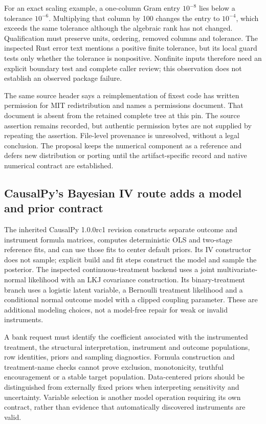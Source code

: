 For an exact scaling example, a one-column Gram entry $10^{-8}$ lies below
a tolerance $10^{-6}$. Multiplying that column by 100 changes the entry to
$10^{-4}$, which exceeds the same tolerance although the algebraic rank
has not changed. Qualification must preserve units, ordering, removed
columns and tolerance. The inspected Rust error text mentions a positive
finite tolerance, but its local guard tests only whether the tolerance is
nonpositive. Nonfinite inputs therefore need an explicit boundary test and
complete caller review; this observation does not establish an observed
package failure.~\citep{exec25_pyrdiv_pyfixest,exec25_pyrdiv_choice}

The same source header says a reimplementation of fixest code has written
permission for MIT redistribution and names a permissions document. That
document is absent from the retained complete tree at this pin. The source
assertion remains recorded, but authentic permission bytes are not supplied
by repeating the assertion. File-level provenance is unresolved, without
a legal conclusion. The proposal keeps the numerical component as a
reference and defers new distribution or porting until the artifact-specific
record and native numerical contract are established.
\citep{exec25_pyrdiv_pyfixest,exec25_pyrdiv_choice}

\subsection{CausalPy's Bayesian IV route adds a model and prior contract}
The inherited CausalPy 1.0.0rc1 revision constructs separate outcome and
instrument formula matrices, computes deterministic OLS and two-stage
reference fits, and can use those fits to center default priors. Its IV
constructor does not sample; explicit build and fit steps construct the
model and sample the posterior. The inspected continuous-treatment backend
uses a joint multivariate-normal likelihood with an LKJ covariance
construction. Its binary-treatment branch uses a logistic latent variable,
a Bernoulli treatment likelihood and a conditional normal outcome model
with a clipped coupling parameter. These are additional modeling choices,
not a model-free repair for weak or invalid instruments.
\citep{exec25_pyrdiv_causalpy}

A bank request must identify the coefficient associated with the
instrumented treatment, the structural interpretation, instrument and
outcome populations, row identities, priors and sampling diagnostics.
Formula construction and treatment-name checks cannot prove exclusion,
monotonicity, truthful encouragement or a stable target population.
Data-centered priors should be distinguished from externally fixed priors
when interpreting sensitivity and uncertainty. Variable selection is
another model operation requiring its own contract, rather than evidence
that automatically discovered instruments are valid.
\citep{exec25_pyrdiv_causalpy,exec25_pyrdiv_choice}

